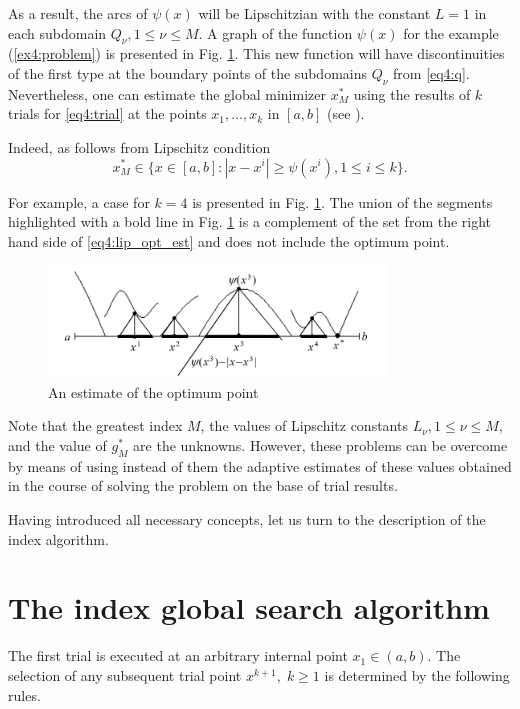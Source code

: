 As a result, the arcs of $\psi(x)$ will be Lipschitzian with the constant $L=1$ in each subdomain $Q_\nu,1\le\nu\le M$. A graph of the function $\psi(x)$ for the example (\ref{ex4:problem}) is presented in Fig. \ref{fig:4_4}. This new function will have discontinuities of the first type at the boundary points of the subdomains $Q_\nu$ from \eqref{eq4:q}. Nevertheless, one can estimate the global minimizer $x^*_M$ using the results of $k$ trials for \eqref{eq4:trial} at the points $x_1,\dots, x_k$ in $[a,b]$ (see \cite{strongin1992}).

Indeed, as follows from Lipschitz condition
\begin{equation}
  \label{eq4:lip_opt_est}
  x^*_M\in\{x\in[a,b]:|x-x^i|\ge\psi(x^i),1\le i\le k\}.
\end{equation}

For example, a case for $k=4$ is presented in Fig. \ref{fig:4_4}. The union of the segments highlighted with a bold line in Fig. \ref{fig:4_4} is a complement of the set from the right hand side of \eqref{eq4:lip_opt_est} and does not include the optimum point.
\begin{figure}[ht]
  \centering
  \includegraphics[width=0.8\textwidth]{figures/4_4.png}
  \caption{An estimate of the optimum point}
  \label{fig:4_4}
\end{figure}

Note that the greatest index $M$, the values of Lipschitz constants $L_\nu, 1\le \nu\le M$, and the value of $g_M^*$ are the unknowns. However, these problems can be overcome by means of using instead of them the adaptive estimates of these values obtained in the course of solving the problem on the base of trial results.

Having introduced all necessary concepts, let us turn to the description of the index algorithm.

\section{The index global search algorithm}
The first trial is executed at an arbitrary internal point $x_1\in(a,b)$. The selection of any subsequent trial point $x^{k+1},\; k\ge 1$ is determined by the following rules.

